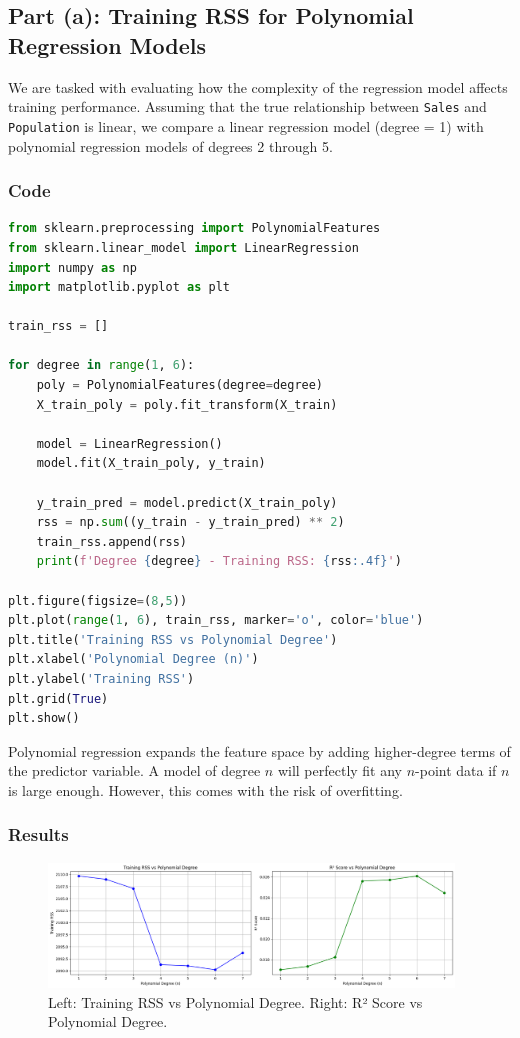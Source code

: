 \documentclass[12pt]{article}
\begin{document}
\subsection*{Part (a): Training RSS for Polynomial Regression Models}
We are tasked with evaluating how the complexity of the regression model affects training performance. Assuming that the true relationship between \texttt{Sales} and \texttt{Population} is linear, we compare a linear regression model (degree = 1) with polynomial regression models of degrees 2 through 5.

\subsubsection*{Code}
\begin{lstlisting}[language=Python, caption=Polynomial Regression: Training RSS]
from sklearn.preprocessing import PolynomialFeatures
from sklearn.linear_model import LinearRegression
import numpy as np
import matplotlib.pyplot as plt

train_rss = []

for degree in range(1, 6):
    poly = PolynomialFeatures(degree=degree)
    X_train_poly = poly.fit_transform(X_train)
    
    model = LinearRegression()
    model.fit(X_train_poly, y_train)
    
    y_train_pred = model.predict(X_train_poly)
    rss = np.sum((y_train - y_train_pred) ** 2)
    train_rss.append(rss)
    print(f'Degree {degree} - Training RSS: {rss:.4f}')
    
plt.figure(figsize=(8,5))
plt.plot(range(1, 6), train_rss, marker='o', color='blue')
plt.title('Training RSS vs Polynomial Degree')
plt.xlabel('Polynomial Degree (n)')
plt.ylabel('Training RSS')
plt.grid(True)
plt.show()
\end{lstlisting}

Polynomial regression expands the feature space by adding higher-degree terms of the predictor variable. A model of degree \( n \) will perfectly fit any \( n \)-point data if \( n \) is large enough. However, this comes with the risk of overfitting.

\subsubsection*{Results}
\begin{figure}[h]
\centering
\includegraphics[width=0.96\textwidth]{images/slr/carseat_train_rss_r2.png}
\caption{Left: Training RSS vs Polynomial Degree. Right: R² Score vs Polynomial Degree.}
\end{figure}
\end{document}
